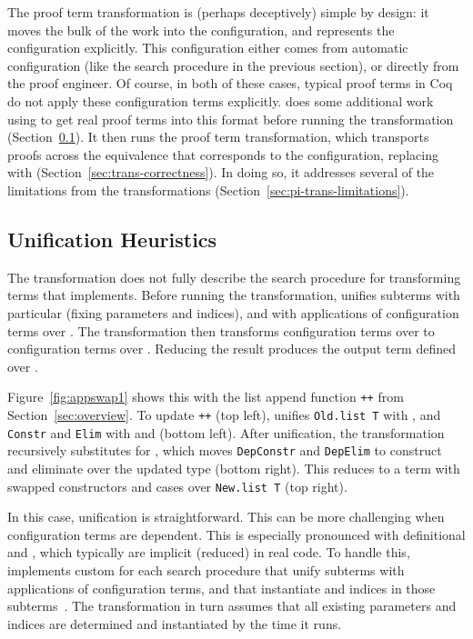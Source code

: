The proof term transformation is (perhaps deceptively) simple by design:
it moves the bulk of the work into the configuration,
and represents the configuration explicitly.
This configuration either comes from automatic configuration (like the search procedure in the previous section),
or directly from the proof engineer.
Of course, in both of these cases, typical proof terms in Coq do not apply these configuration
terms explicitly.
\toolnamec does some additional work using  to get real proof terms into this format before 
running the transformation (Section~\ref{sec:trans-unification}).
It then runs the proof term transformation, which transports proofs across the equivalence that corresponds to the configuration,
replacing \Aa with \B (Section~\ref{sec:trans-correctness}).
In doing so, it addresses several of the limitations from the \sysname transformations (Section~\ref{sec:pi-trans-limitations}).

\subsection{Unification Heuristics}
\label{sec:trans-unification}

The transformation does not fully describe the search procedure for transforming terms that \toolnamec implements.
Before running the transformation, \toolnamec unifies subterms with particular \Aa (fixing parameters and indices),
and with applications of configuration terms over \Aa. 
The transformation then transforms configuration terms over \Aa
to configuration terms over \B.
Reducing the result produces the output term defined over \B.

Figure~\ref{fig:appswap1} shows this with the list append function \lstinline{++} from Section~\ref{sec:overview}.
To update \lstinline{++} (top left), \toolnamec unifies \lstinline{Old.list T} with \Aa, and \lstinline{Constr} and \lstinline{Elim}
with  and  (bottom left).
After unification, the transformation recursively substitutes \B
for \Aa, which moves \lstinline{DepConstr} and \lstinline{DepElim}
to construct and eliminate over the updated type (bottom right).
This reduces to a term with swapped constructors and cases over \lstinline{New.list T} (top right).

In this case, unification is straightforward.
This can be more challenging when configuration terms are dependent.
This is especially pronounced with definitional  and ,
which typically are implicit (reduced) in real code.
To handle this, \toolnamec implements custom  for each search procedure
that unify subterms with applications of configuration terms, and that instantiate  and  indices in those subterms~\href{https://github.com/uwplse/pumpkin-pi/blob/v2.0.0/plugin/src/automation/lift/liftconfig.ml}{}. %
The transformation in turn assumes that all existing parameters and indices are determined and instantiated
by the time it runs.

